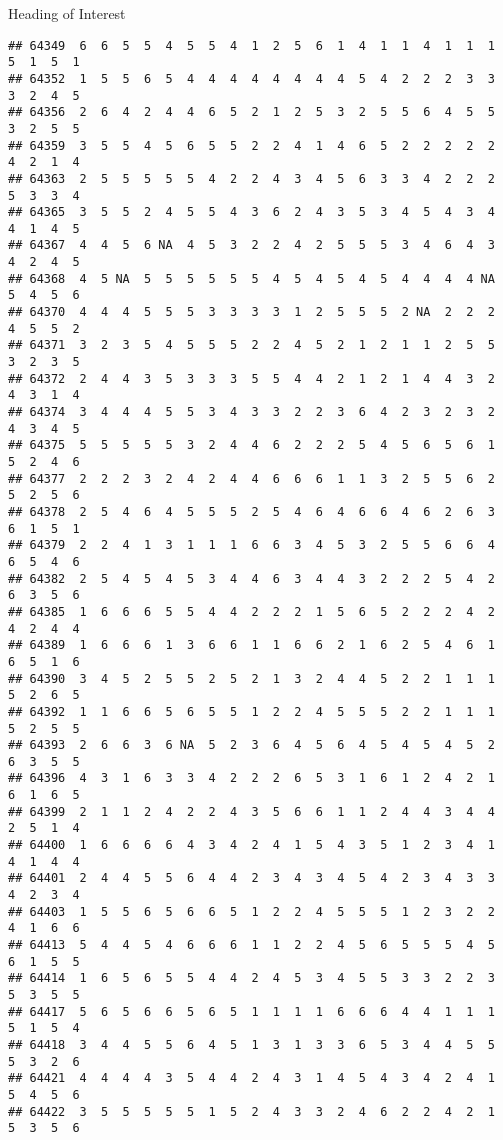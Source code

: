 \documentclass[
  ignorenonframetext,
]{beamer}
\begin{document}
\begin{frame}[fragile]{Heading of Interest}
\begin{verbatim}
## 64349  6  6  5  5  4  5  5  4  1  2  5  6  1  4  1  1  4  1  1  1  5  1  5  1
## 64352  1  5  5  6  5  4  4  4  4  4  4  4  4  5  4  2  2  2  3  3  3  2  4  5
## 64356  2  6  4  2  4  4  6  5  2  1  2  5  3  2  5  5  6  4  5  5  3  2  5  5
## 64359  3  5  5  4  5  6  5  5  2  2  4  1  4  6  5  2  2  2  2  2  4  2  1  4
## 64363  2  5  5  5  5  5  4  2  2  4  3  4  5  6  3  3  4  2  2  2  5  3  3  4
## 64365  3  5  5  2  4  5  5  4  3  6  2  4  3  5  3  4  5  4  3  4  4  1  4  5
## 64367  4  4  5  6 NA  4  5  3  2  2  4  2  5  5  5  3  4  6  4  3  4  2  4  5
## 64368  4  5 NA  5  5  5  5  5  5  4  5  4  5  4  5  4  4  4  4 NA  5  4  5  6
## 64370  4  4  4  5  5  5  3  3  3  3  1  2  5  5  5  2 NA  2  2  2  4  5  5  2
## 64371  3  2  3  5  4  5  5  5  2  2  4  5  2  1  2  1  1  2  5  5  3  2  3  5
## 64372  2  4  4  3  5  3  3  3  5  5  4  4  2  1  2  1  4  4  3  2  4  3  1  4
## 64374  3  4  4  4  5  5  3  4  3  3  2  2  3  6  4  2  3  2  3  2  4  3  4  5
## 64375  5  5  5  5  5  3  2  4  4  6  2  2  2  5  4  5  6  5  6  1  5  2  4  6
## 64377  2  2  2  3  2  4  2  4  4  6  6  6  1  1  3  2  5  5  6  2  5  2  5  6
## 64378  2  5  4  6  4  5  5  5  2  5  4  6  4  6  6  4  6  2  6  3  6  1  5  1
## 64379  2  2  4  1  3  1  1  1  6  6  3  4  5  3  2  5  5  6  6  4  6  5  4  6
## 64382  2  5  4  5  4  5  3  4  4  6  3  4  4  3  2  2  2  5  4  2  6  3  5  6
## 64385  1  6  6  6  5  5  4  4  2  2  2  1  5  6  5  2  2  2  4  2  4  2  4  4
## 64389  1  6  6  6  1  3  6  6  1  1  6  6  2  1  6  2  5  4  6  1  6  5  1  6
## 64390  3  4  5  2  5  5  2  5  2  1  3  2  4  4  5  2  2  1  1  1  5  2  6  5
## 64392  1  1  6  6  5  6  5  5  1  2  2  4  5  5  5  2  2  1  1  1  5  2  5  5
## 64393  2  6  6  3  6 NA  5  2  3  6  4  5  6  4  5  4  5  4  5  2  6  3  5  5
## 64396  4  3  1  6  3  3  4  2  2  2  6  5  3  1  6  1  2  4  2  1  6  1  6  5
## 64399  2  1  1  2  4  2  2  4  3  5  6  6  1  1  2  4  4  3  4  4  2  5  1  4
## 64400  1  6  6  6  6  4  3  4  2  4  1  5  4  3  5  1  2  3  4  1  4  1  4  4
## 64401  2  4  4  5  5  6  4  4  2  3  4  3  4  5  4  2  3  4  3  3  4  2  3  4
## 64403  1  5  5  6  5  6  6  5  1  2  2  4  5  5  5  1  2  3  2  2  4  1  6  6
## 64413  5  4  4  5  4  6  6  6  1  1  2  2  4  5  6  5  5  5  4  5  6  1  5  5
## 64414  1  6  5  6  5  5  4  4  2  4  5  3  4  5  5  3  3  2  2  3  5  3  5  5
## 64417  5  6  5  6  6  5  6  5  1  1  1  1  6  6  6  4  4  1  1  1  5  1  5  4
## 64418  3  4  4  5  5  6  4  5  1  3  1  3  3  6  5  3  4  4  5  5  5  3  2  6
## 64421  4  4  4  4  3  5  4  4  2  4  3  1  4  5  4  3  4  2  4  1  5  4  5  6
## 64422  3  5  5  5  5  5  1  5  2  4  3  3  2  4  6  2  2  4  2  1  5  3  5  6

\end{verbatim}
\end{frame}
\end{document}
